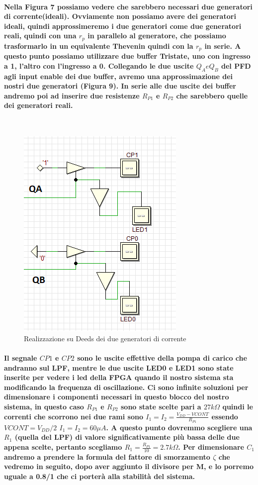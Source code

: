 \documentclass{article}
\begin{document}
\paragraph{Nella Figura 7 possiamo vedere che sarebbero necessari due generatori di corrente(ideali).
Ovviamente non possiamo avere dei generatori ideali, quindi approssimeremo i due generatori come due generatori reali, quindi con una $r_p$ in parallelo al generatore, che possiamo trasformarlo in un equivalente Thevenin quindi con la $r_p$ in serie.
A questo punto possiamo utilizzare due buffer Tristate, uno con ingresso a 1, l'altro con l'ingresso a 0. Collegando le due uscite $Q_A e Q_B$ del PFD agli input enable dei due buffer, avremo una approssimazione dei nostri due generatori (Figura 9). In serie alle due uscite dei buffer andremo poi ad inserire due resistenze $R_{P1}$ e  $R_{P2}$ che sarebbero quelle dei generatori reali.}
~\begin{figure}[!h]%
\includegraphics[scale=0.8]{CPDeeds.png} 
\centering
\caption{Realizzazione su Deeds dei due generatori di corrente}
\label{fig:foo}
\end{figure}
\paragraph{Il segnale $CP1$ e $CP2$ sono le uscite effettive della pompa di carico che andranno sul LPF, mentre le due uscite LED0 e LED1 sono state inserite per vedere i led della FPGA quando il nostro sistema sta modificando la frequenza di oscillazione. Ci sono infinite soluzioni per dimensionare i componenti necessari in questo blocco del nostro sistema, in questo caso $R_{P1}$ e  $R_{P2}$ sono state scelte pari a $27k\Omega$ quindi le correnti che scorrono nei due rami sono $I_1=I_2=\frac{V_{DD}-V{CONT}}{R_{P1}}$ essendo $V{CONT}=V_{DD}/2$ $I_1=I_2=60\mu A$. A questo punto dovremmo scegliere una $R_1$ (quella del LPF) di valore significativamente più bassa delle due appena scelte, pertanto scegliamo $R_1=\frac{R_{P1}}{10}=2.7k\Omega$.
Per dimensionare $C_1$ andremo a prendere la formula del fattore di smorzamento $\zeta$ che vedremo in seguito, dopo aver aggiunto il divisore per M, e lo porremo uguale a 0.8/1 che ci porterà alla stabilità del sistema. }
\end{document}
